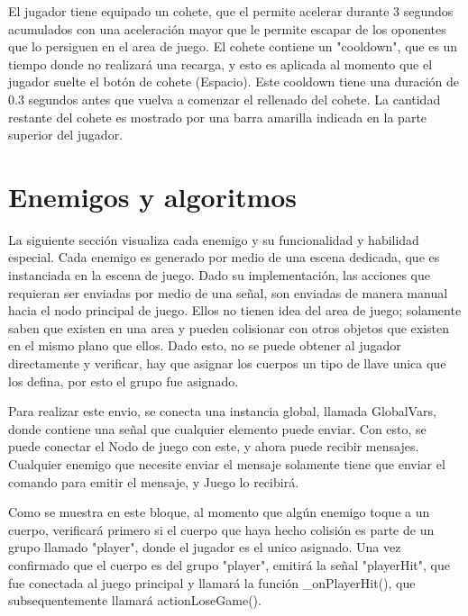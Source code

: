 \documentclass{article}
\begin{document}
El jugador tiene equipado un cohete, que el permite acelerar durante 3 segundos acumulados con una aceleración mayor que le permite
escapar de los oponentes que lo persiguen en el area de juego. El cohete contiene un "cooldown", que es un tiempo donde no realizará una recarga,
y esto es aplicada al momento que el jugador suelte el botón de cohete (Espacio). Este cooldown tiene una duración de 0.3 segundos antes que vuelva a
comenzar el rellenado del cohete. La cantidad restante del cohete es mostrado por una barra amarilla indicada en la parte superior del jugador.

\section{Enemigos y algoritmos}

La siguiente sección visualiza cada enemigo y su funcionalidad y habilidad especial. Cada enemigo es generado por medio de una escena dedicada,
que es instanciada en la escena de juego. Dado su implementación, las acciones que requieran ser enviadas por medio de una señal, son enviadas de manera
manual hacia el nodo principal de juego. Ellos no tienen idea del area de juego; solamente saben que existen en una area y pueden colisionar con otros objetos que existen en el mismo plano que ellos. Dado esto, no se puede
obtener al jugador directamente y verificar, hay que asignar los cuerpos un tipo de llave unica que los defina, por esto el grupo fue asignado.



Para realizar este envio, se conecta una instancia global, llamada GlobalVars, donde contiene una señal que cualquier elemento puede enviar. Con esto, se puede conectar
el Nodo de juego con este, y ahora puede recibir mensajes. Cualquier enemigo que necesite enviar el mensaje solamente tiene que enviar el comando para emitir
el mensaje, y Juego lo recibirá.





Como se muestra en este bloque, al momento que algún enemigo toque a un cuerpo, verificará primero si el cuerpo que haya hecho colisión es parte de un grupo llamado
"player", donde el jugador es el unico asignado. Una vez confirmado que el cuerpo es del grupo "player", emitirá la señal "playerHit", que fue conectada al juego principal y
llamará la función \_onPlayerHit(), que subsequentemente llamará actionLoseGame().
\end{document}
